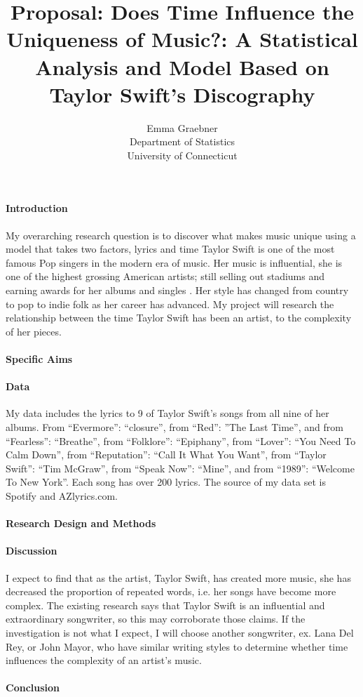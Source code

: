 \documentclass[12pt]{article}
\title{Proposal: Does Time Influence the Uniqueness of Music?: A Statistical Analysis and Model Based on Taylor Swift's Discography}
\author{Emma Graebner\\
  Department of Statistics\\
  University of Connecticut
}
\begin{document}
\maketitle


\paragraph{Introduction}
My overarching research question is to discover what makes music unique using a model that takes two factors, lyrics and time Taylor Swift is one of the most famous Pop singers in the modern era of music. Her music is influential, she is one of the highest grossing American artists; still selling out stadiums and earning awards for her albums and singles \citep{fogarty2021you} . Her style has changed from country to pop to indie folk as her career has advanced. My project will research the relationship between the time Taylor Swift has been an artist, to the complexity of her pieces. \citep{sloan2021taylor} 


\citep{perone2017words}

\paragraph{Specific Aims}


\paragraph{Data}
My data includes the lyrics to 9 of Taylor Swift’s songs from all nine of her albums. From “Evermore”: “closure”, from “Red”: ”The Last Time”, and from “Fearless”: “Breathe”, from “Folklore”: “Epiphany”, from “Lover”: “You Need To Calm Down”, from “Reputation”: “Call It What You Want”, from “Taylor Swift”: “Tim McGraw”, from “Speak Now”: “Mine”, and from “1989”: “Welcome To New York”. Each song has over 200 lyrics. The source of my data set is Spotify and AZlyrics.com.  
\paragraph{Research Design and Methods}


\paragraph{Discussion}
I expect to find that as the artist, Taylor Swift, has created more music, she has decreased the proportion of repeated words, i.e. her songs have become more complex. The existing research says that Taylor Swift is an influential and extraordinary songwriter, so this may corroborate those claims. If the investigation is not what I expect, I will choose another songwriter, ex. Lana Del Rey, or John Mayor, who have similar writing styles to determine whether time influences the complexity of an artist’s music. 

\paragraph{Conclusion}




\end{document}
